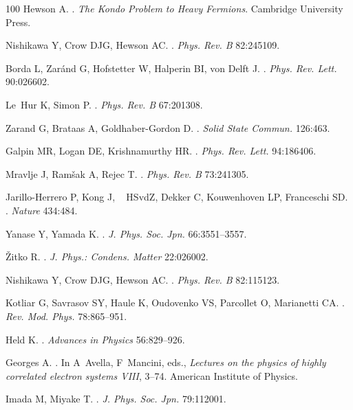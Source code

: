 \documentclass[]{ar2e-changed}%
\begin{document}
\begin{thebibliography}{100}
Hewson A.
.
\newblock \emph{The Kondo Problem to Heavy Fermions}.
\newblock Cambridge University Press.

Nishikawa Y, Crow DJG, Hewson AC.
.
\newblock \emph{Phys. Rev. B} 82:245109.

Borda L, Zar\'and G, Hofstetter W, Halperin BI, von Delft J.
.
\newblock \emph{Phys. Rev. Lett.} 90:026602.

Le~Hur K, Simon P.
.
\newblock \emph{Phys. Rev. B} 67:201308.

Zarand G, Brataas A, Goldhaber-Gordon D.
.
\newblock \emph{Solid State Commun.} 126:463.

Galpin MR, Logan DE, Krishnamurthy HR.
.
\newblock \emph{Phys. Rev. Lett.} 94:186406.

Mravlje J, Ram\v{s}ak A, Rejec T.
.
\newblock \emph{Phys. Rev. B} 73:241305.

Jarillo-Herrero P, Kong J, ~ HSvdZ, Dekker C, Kouwenhoven LP, Franceschi SD.
.
\newblock \emph{Nature} 434:484.

Yanase Y, Yamada K.
.
\newblock \emph{J. Phys. Soc. Jpn.} 66:3551--3557.

\v{Z}itko R.
.
\newblock \emph{J. Phys.: Condens. Matter} 22:026002.

Nishikawa Y, Crow DJG, Hewson AC.
.
\newblock \emph{Phys. Rev. B} 82:115123.

Kotliar G, Savrasov SY, Haule K, Oudovenko VS, Parcollet O, Marianetti CA.
.
\newblock \emph{Rev. Mod. Phys.} 78:865--951.

Held K.
.
\newblock \emph{Advances in Physics} 56:829--926.

{Georges} A.
.
\newblock In A~Avella, F~Mancini, eds., \emph{Lectures on the physics of highly
  correlated electron systems VIII}, 3--74. American Institute of Physics.

Imada M, Miyake T.
.
\newblock \emph{J. Phys. Soc. Jpn.} 79:112001.


\end{thebibliography}
\end{document}

